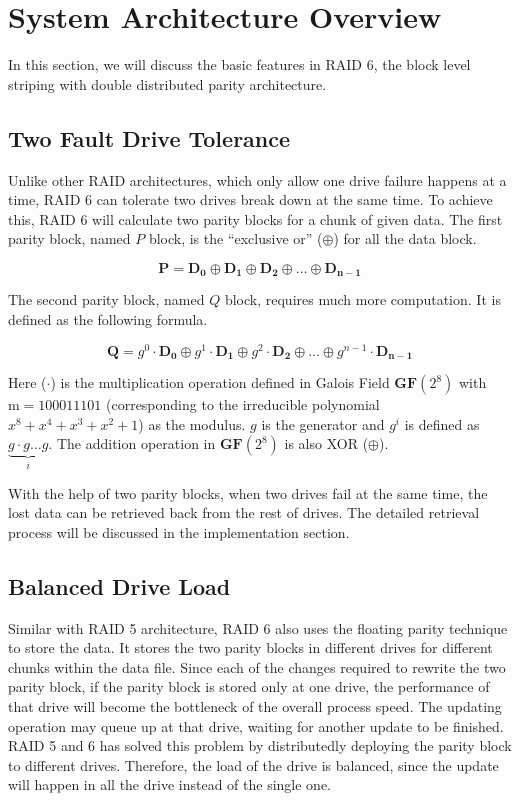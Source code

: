 \section{System Architecture Overview}

In this section, we will discuss the basic features in RAID 6, the block level striping with double distributed parity architecture.

\subsection{Two Fault Drive Tolerance}
Unlike other RAID architectures, which only allow one drive failure happens at a time, RAID 6 can tolerate two drives break down at the same time. To achieve this, RAID 6 will calculate two parity blocks for a chunk of given data. The first parity block, named $P$ block, is the ``exclusive or'' ($\oplus$) for all the data block. 

\begin{equation}\label{eq:gen_p}
	\mathbf{P = D_0 \oplus D_1 \oplus D_2 \oplus \ldots \oplus D_{n-1}}
\end{equation}

The second parity block, named $Q$ block, requires much more computation. It is defined as the following formula.

\begin{equation}\label{eq:gen_q}
	\mathbf{Q} = g^0\cdot \mathbf{D_0} \oplus g^1\cdot \mathbf{D_1} \oplus g^2\cdot \mathbf{D_2} \oplus \ldots \oplus g^{n-1}\cdot \mathbf{D_{n-1}}
\end{equation}

Here ($\cdot$) is the multiplication operation defined in Galois Field $\mathbf{GF}(2^8)$ with $\mathrm{m}=100011101$ (corresponding to the irreducible polynomial $x^8+x^4+x^3+x^2+1$) as the modulus. $g$ is the generator and $g^{i}$ is defined as $\underbrace{g\cdot g\ldots g}_{i}$. The addition operation in $\mathbf{GF}(2^8)$ is also XOR ($\oplus$).

With the help of two parity blocks, when two drives fail at the same time, the lost data can be retrieved back from the rest of drives. The detailed retrieval process will be discussed in the implementation section.


\subsection{Balanced Drive Load}
Similar with RAID 5 architecture, RAID 6 also uses the floating parity technique to store the data. It stores the two parity blocks in different drives for different chunks within the data file. Since each of the changes required to rewrite the two parity block, if the parity block is stored only at one drive, the performance of that drive will become the bottleneck of the overall process speed. The updating operation may queue up at that drive, waiting for another update to be finished. RAID 5 and 6 has solved this problem by distributedly deploying the parity block to different drives. Therefore, the load of the drive is balanced, since the update will happen in all the drive instead of the single one.

